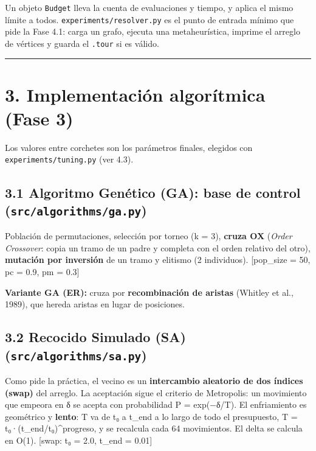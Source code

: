 \documentclass[
  spanish,
  11pt,
]{article}
\begin{document}
Un objeto \texttt{Budget} lleva la cuenta de evaluaciones y tiempo, y
aplica el mismo límite a todos. \texttt{experiments/resolver.py} es el
punto de entrada mínimo que pide la Fase 4.1: carga un grafo, ejecuta
una metaheurística, imprime el arreglo de vértices y guarda el
\texttt{.tour} si es válido.

\begin{center}\rule{0.5\linewidth}{0.5pt}\end{center}

\section{3. Implementación algorítmica (Fase
3)}\label{implementaciuxf3n-algoruxedtmica-fase-3}

Los valores entre corchetes son los parámetros finales, elegidos con
\texttt{experiments/tuning.py} (ver 4.3).

\subsection{\texorpdfstring{3.1 Algoritmo Genético (GA): base de control
(\texttt{src/algorithms/ga.py})}{3.1 Algoritmo Genético (GA): base de control (src/algorithms/ga.py)}}\label{algoritmo-genuxe9tico-ga-base-de-control-srcalgorithmsga.py}

Población de permutaciones, selección por torneo (k = 3), \textbf{cruza
OX} (\emph{Order Crossover}: copia un tramo de un padre y completa con
el orden relativo del otro), \textbf{mutación por inversión} de un tramo
y elitismo (2 individuos). {[}pop\_size = 50, pc = 0.9, pm = 0.3{]}

\textbf{Variante GA (ER):} cruza por \textbf{recombinación de aristas}
(Whitley et al., 1989), que hereda aristas en lugar de posiciones.

\subsection{\texorpdfstring{3.2 Recocido Simulado (SA)
(\texttt{src/algorithms/sa.py})}{3.2 Recocido Simulado (SA) (src/algorithms/sa.py)}}\label{recocido-simulado-sa-srcalgorithmssa.py}

Como pide la práctica, el vecino es un \textbf{intercambio aleatorio de
dos índices (swap)} del arreglo. La aceptación sigue el criterio de
Metropolis: un movimiento que empeora en δ se acepta con probabilidad P
= exp(−δ/T). El enfriamiento es geométrico y \textbf{lento}: T va de t₀
a t\_end a lo largo de todo el presupuesto, T =
t₀·(t\_end/t₀)\^{}progreso, y se recalcula cada 64 movimientos. El delta
se calcula en O(1). {[}swap: t₀ = 2.0, t\_end = 0.01{]}
\end{document}
